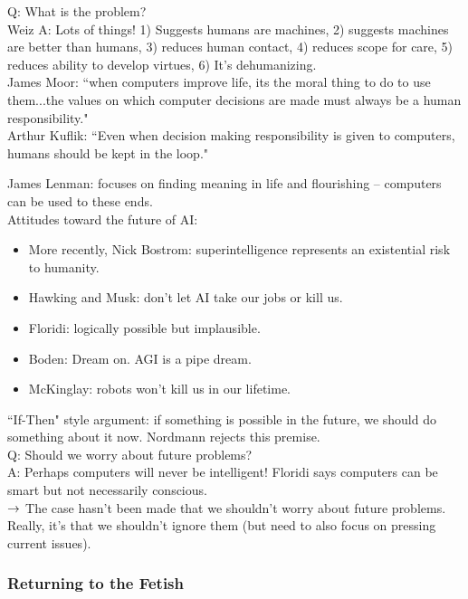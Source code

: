 Q: What is the problem? \\

Weiz A: Lots of things! 1) Suggests humans are machines, 2) suggests machines are better than humans, 3) reduces human contact, 4) reduces scope for care, 5) reduces ability to develop virtues, 6) It's dehumanizing. \\

James Moor: ``when computers improve life, its the moral thing to do to use them...the values on which computer decisions are made must always be a human responsibility." \\

Arthur Kuflik: ``Even when decision making responsibility is given to computers, humans should be kept in the loop."

James Lenman: focuses on finding meaning in life and flourishing -- computers can be used to these ends. \\



Attitudes toward the future of AI:
\begin{itemize}
\item More recently, Nick Bostrom: superintelligence represents an existential risk to humanity.

\item Hawking and Musk: don't let AI take our jobs or kill us.
\item Floridi: logically possible but implausible.
\item Boden: Dream on. AGI is a pipe dream.
\item McKinglay: robots won't kill us in our lifetime.
\end{itemize}

``If-Then" style argument: if something is possible in the future, we should do something about it now. Nordmann rejects this premise. \\

Q: Should we worry about future problems? \\

A: Perhaps computers will never be intelligent! Floridi says computers can be smart but not necessarily conscious. \\

$\rightarrow$ The case hasn't been made that we shouldn't worry about future problems. Really, it's that we shouldn't ignore them (but need to also focus on pressing current issues). \\

\subsubsection{Returning to the Fetish}


